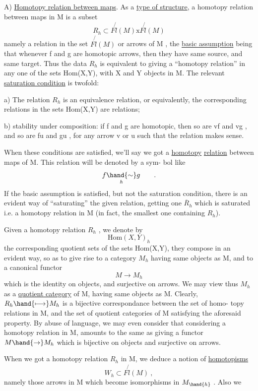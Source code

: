 
A) \uline{Homotopy relation between maps}. As a \uline{type of structure}, a
homotopy relation between maps in M is a subset
\[ R_h \subset F\!\not{l}(M)\mathrm{x}F\!\not{l}(M) \]
namely a relation in the set $F\!\not{l}(M)$ or arrows of M , the \uline{basic assumption}
being that whenever f and g are homotopic arrows, then they have same
source, and same target. Thus the data $R_h$ is equivalent to giving a
``homotopy relation'' in any one of the sets Hom(X,Y), with X and Y objects
in M. The relevant \uline{saturation condition} is twofold:

a) The relation $R_h$ is an equivalence relation, or equivalently, the
corresponding relations in the sets Hom(X,Y) are  relations;

b) stability under composition: if f and g are homotopic, then so
are vf and vg , and so are fu and gu , for any arrow v or u such that
the relation makes sense.

When these conditions are satisfied, we'll say we got a \uline{homotopy}
\uline{relation}  between maps of M. This relation  will be denoted by a sym-%
bol like
\[ f \underset{h}{\hand{\sim}} g \qquad . \]
If the basic assumption is satisfied, but not the saturation condition,
there is an evident way of ``saturating'' the given relation, getting
 one $\overline{R}_h$ which is saturated i.e. a homotopy relation in M
(in fact, the smallest one containing $R_h$).

Given a homotopy relation $R_h$ , we denote by 
\[ \mathrm{Hom}(X,Y)_h \]
the corresponding quotient sets of the sets Hom(X,Y), they compose in an
evident way, so as to give rise to a  category $M_h$ having same
objects as M, and to a canonical functor
\[ M \longrightarrow M_h \]
which is the identity on objects, and surjective on arrows. We may
view thus $M_h$ as a \uline{quotient category} of M, having same objects as M.
Clearly, $R_h \hand{\longmapsto} M_h$ is a bijective correspondance between the set of homo-%
topy relations in M, and the set of quotient categories of M satisfying
the aforesaid property. By abuse of language, we may even consider that
considering a homotopy relation in M, amounts to the same as giving a
functor $M \hand{\rightarrow} M_h$  which is bijective on objects and surjective on arrows.

When we got a homotopy relation $R_h$ in M, we deduce a notion of
\uline{homotopisms}
\[ W_h \subset F\!\not{l}(M) \ , \]
namely those arrows in M which  become isomorphisms in $M_{\hand{h}}$ . Also we

